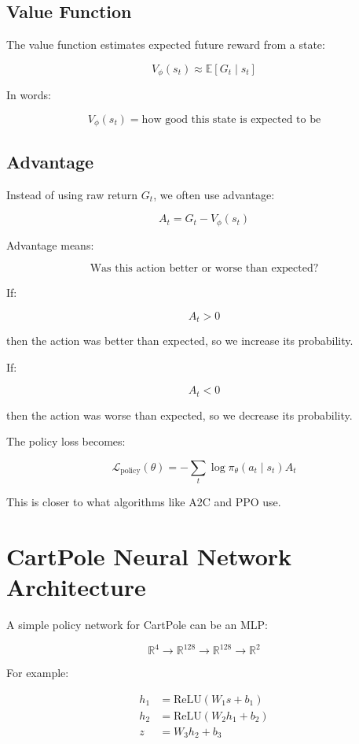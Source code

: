 \documentclass[11pt]{article}
\begin{document}
\subsection{Value Function}

The value function estimates expected future reward from a state:

\[
V_\phi(s_t) \approx \mathbb{E}[G_t \mid s_t]
\]

In words:

\[
\boxed{
V_\phi(s_t) = \text{how good this state is expected to be}
}
\]

\subsection{Advantage}

Instead of using raw return $G_t$, we often use advantage:

\[
A_t = G_t - V_\phi(s_t)
\]

Advantage means:

\[
\boxed{
\text{Was this action better or worse than expected?}
}
\]

If:

\[
A_t > 0
\]

then the action was better than expected, so we increase its probability.

If:

\[
A_t < 0
\]

then the action was worse than expected, so we decrease its probability.

The policy loss becomes:

\[
\boxed{
\mathcal{L}_{\text{policy}}(\theta)
= -\sum_t \log \pi_\theta(a_t \mid s_t) A_t
}
\]

This is closer to what algorithms like A2C and PPO use.

\section{CartPole Neural Network Architecture}

A simple policy network for CartPole can be an MLP:

\[
\mathbb{R}^4 \rightarrow \mathbb{R}^{128} \rightarrow \mathbb{R}^{128} \rightarrow \mathbb{R}^{2}
\]

For example:

\[
\begin{aligned}
 h_1 &= \text{ReLU}(W_1s + b_1) \\
 h_2 &= \text{ReLU}(W_2h_1 + b_2) \\
 z &= W_3h_2 + b_3
\end{aligned}
\]
\end{document}
